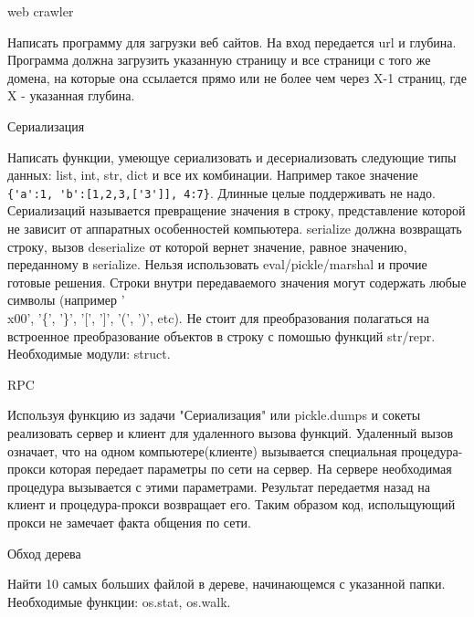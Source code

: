 \documentclass{article}
\begin{document}
\begin{center} web crawler \end{center}
Написать программу для загрузки веб сайтов. На вход передается url и глубина.
Программа должна загрузить указанную страницу и все страници с того же домена,
на которые она ссылается прямо или не более чем через X-1 страниц, где X - 
указанная глубина.
\newpage

\begin{center} Сериализация \end{center}
Написать функции, умеющуе сериализовать и десериализовать следующие типы данных:
list, int, str, dict и все их комбинации. Например такое значение
\lstinline!{'a':1, 'b':[1,2,3,['3']], 4:7}!. Длинные целые поддерживать не надо.
Сериализаций называется превращение значения в строку, представление которой не 
зависит от аппаратных особенностей компьютера. serialize должна возвращать строку,
вызов deserialize от которой вернет значение, равное значению, переданному в 
serialize. Нельзя использовать eval/pickle/marshal и прочие готовые решения.
Строки внутри передаваемого значения могут содержать любые символы (например
'\\x00', '\{', '\}', '[', ']', '(', ')', etc). Не стоит для преобразования 
полагаться на встроенное преобразование объектов в строку с помошью функций 
str/repr. 
Необходимые модули: struct. 
\newpage

\begin{center} RPC \end{center}
Используя функцию из задачи "Сериализация" или pickle.dumps и сокеты 
реализовать сервер и клиент для удаленного вызова функций. Удаленный вызов
означает, что на одном компьютере(клиенте) вызывается специальная процедура-прокси
которая передает параметры по сети на сервер. На сервере необходимая процедура 
вызывается с этими параметрами. Результат передаетмя назад на клиент и 
процедура-прокси возвращает его. Таким образом код, испольщующий прокси не замечает
факта общения по сети.
\newpage

\begin{center} Обход дерева \end{center}
Найти 10 самых больших файлой в дереве, начинающемся с указанной папки.
Необходимые функции: os.stat, os.walk.
\newpage
\end{document}
